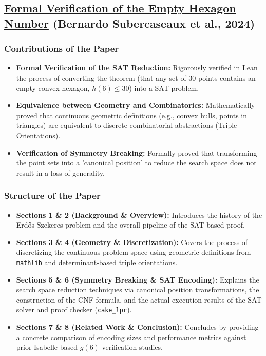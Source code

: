 \documentclass{article}
\begin{document}
\subsection{\href{https://drops.dagstuhl.de/storage/00lipics/lipics-vol309-itp2024/LIPIcs.ITP.2024.35/LIPIcs.ITP.2024.35.pdf}{\textbf{Formal Verification of the Empty Hexagon Number}} (Bernardo Subercaseaux et al., 2024)}

\subsubsection{Contributions of the Paper}
\begin{itemize}
    \item \textbf{Formal Verification of the SAT Reduction:} Rigorously verified in Lean the process of converting the theorem (that any set of 30 points contains an empty convex hexagon, $h(6) \le 30$) into a SAT problem.
    \item \textbf{Equivalence between Geometry and Combinatorics:} Mathematically proved that continuous geometric definitions (e.g., convex hulls, points in triangles) are equivalent to discrete combinatorial abstractions (Triple Orientations).
    \item \textbf{Verification of Symmetry Breaking:} Formally proved that transforming the point sets into a 'canonical position' to reduce the search space does not result in a loss of generality.
\end{itemize}

\subsubsection{Structure of the Paper}
\begin{itemize}
    \item \textbf{Sections 1 \& 2 (Background \& Overview):} Introduces the history of the Erd\H{o}s-Szekeres problem and the overall pipeline of the SAT-based proof.
    \item \textbf{Sections 3 \& 4 (Geometry \& Discretization):} Covers the process of discretizing the continuous problem space using geometric definitions from \texttt{mathlib} and determinant-based triple orientations.
    \item \textbf{Sections 5 \& 6 (Symmetry Breaking \& SAT Encoding):} Explains the search space reduction techniques via canonical position transformations, the construction of the CNF formula, and the actual execution results of the SAT solver and proof checker (\texttt{cake\_lpr}).
    \item \textbf{Sections 7 \& 8 (Related Work \& Conclusion):} Concludes by providing a concrete comparison of encoding sizes and performance metrics against prior Isabelle-based $g(6)$ verification studies.
\end{itemize}
\end{document}

